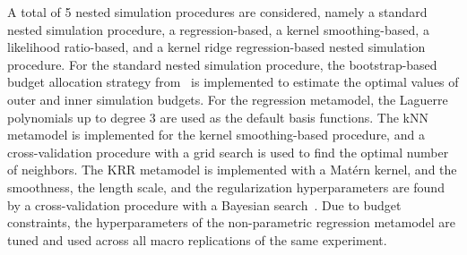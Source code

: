 A total of 5 nested simulation procedures are considered, namely a standard nested simulation procedure, a  regression-based, a kernel smoothing-based, a likelihood ratio-based, and a kernel ridge regression-based nested simulation procedure.
For the standard nested simulation procedure, the bootstrap-based budget allocation strategy from~\cite{zhang2021bootstrap} is implemented to estimate the optimal values of outer and inner simulation budgets.
For the regression metamodel, the Laguerre polynomials up to degree $3$ are used as the default basis functions.
The kNN metamodel is implemented for the kernel smoothing-based procedure, and a cross-validation procedure with a grid search is used to find the optimal number of neighbors.
The KRR metamodel is implemented with a Mat\'ern kernel, and the smoothness, the length scale, and the regularization hyperparameters are found by a cross-validation procedure with a Bayesian search~\citep{frazier2018bayesian}.
Due to budget constraints, the hyperparameters of the non-parametric regression metamodel are tuned and used across all macro replications of the same experiment.

